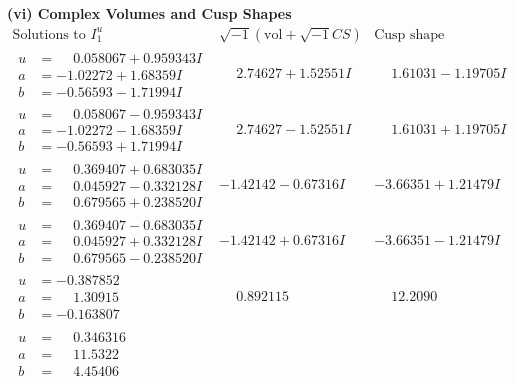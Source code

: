 \documentclass[1p]{elsarticle_modified}
\theoremstyle{definition}
\newcommand{\I}{\sqrt{-1}}
\begin{document}
\newpage\flushleft \textbf{(vi) Complex Volumes and Cusp Shapes}
$$\begin{array}{c|c|c}  
\text{Solutions to }I^u_{1}& \I (\text{vol} + \sqrt{-1}CS) & \text{Cusp shape}\\
 \hline 
\begin{aligned}
u &= \phantom{-}0.058067 + 0.959343 I \\
a &= -1.02272 + 1.68359 I \\
b &= -0.56593 - 1.71994 I\end{aligned}
 & \phantom{-}2.74627 + 1.52551 I & \phantom{-}1.61031 - 1.19705 I \\ \hline\begin{aligned}
u &= \phantom{-}0.058067 - 0.959343 I \\
a &= -1.02272 - 1.68359 I \\
b &= -0.56593 + 1.71994 I\end{aligned}
 & \phantom{-}2.74627 - 1.52551 I & \phantom{-}1.61031 + 1.19705 I \\ \hline\begin{aligned}
u &= \phantom{-}0.369407 + 0.683035 I \\
a &= \phantom{-}0.045927 - 0.332128 I \\
b &= \phantom{-}0.679565 + 0.238520 I\end{aligned}
 & -1.42142 - 0.67316 I & -3.66351 + 1.21479 I \\ \hline\begin{aligned}
u &= \phantom{-}0.369407 - 0.683035 I \\
a &= \phantom{-}0.045927 + 0.332128 I \\
b &= \phantom{-}0.679565 - 0.238520 I\end{aligned}
 & -1.42142 + 0.67316 I & -3.66351 - 1.21479 I \\ \hline\begin{aligned}
u &= -0.387852\phantom{ +0.000000I} \\
a &= \phantom{-}1.30915\phantom{ +0.000000I} \\
b &= -0.163807\phantom{ +0.000000I}\end{aligned}
 & \phantom{-}0.892115\phantom{ +0.000000I} & \phantom{-}12.2090\phantom{ +0.000000I} \\ \hline\begin{aligned}
u &= \phantom{-}0.346316\phantom{ +0.000000I} \\
a &= \phantom{-}11.5322\phantom{ +0.000000I} \\
b &= \phantom{-}4.45406\phantom{ +0.000000I}\end{aligned}

\end{array}$$
\end{document}
